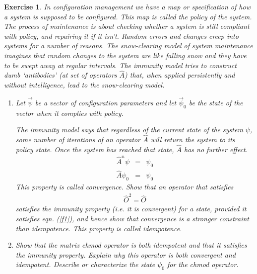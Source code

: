 \documentclass{book}
\newtheorem{exercise}{Exercise}
\def\beq{\begin{eqnarray}}
\def\eeq{\end{eqnarray}}
\begin{document}
\begin{exercise}

In configuration management we have a map or specification of how a
system is supposed to be configured. This map is called the {\em
policy} of the system. The process of maintenance is about checking
whether a system is still compliant with policy, and repairing it if
it isn't. Random errors and changes creep into systems for a number of
reasons. The {\em snow-clearing model} of system maintenance imagines
that random changes to the system are like falling snow and they have
to be swept away at regular intervals. The {\em immunity model} tries
to construct dumb `antibodies' (at set of operators $\hat A$) that,
when applied persistently and without intelligence, lead to the
snow-clearing model.
\begin{enumerate}
\item Let $\vec \psi$ be a vector of configuration parameters and let
$\vec \psi_0$ be the state of the vector when it complies with
policy.

The immunity model says that regardless of the current state of the system
$\psi$, some number of iterations of an operator $\hat A$ will return
the system to its policy state. Once the system has reached that
state, $\hat A$ has no further effect.
\beq
\hat A^n \psi &=& \psi_0\label{f1}\\
\hat A \psi_0 &=& \psi_0
\eeq
This property is called {\em convergence}.
Show that an operator that satisfies
\beq
\hat O^2 = \hat O
\eeq
satisfies the immunity property (i.e. it is convergent) for a state,
provided it satisfies eqn. (\ref{f1}),
and hence show that convergence is a stronger constraint than idempotence.
This property is called {\em idempotence}.

\item
Show that the matrix chmod operator is both idempotent and that it
satisfies the immunity property. 
Explain why this operator is both convergent and idempotent.
Describe or characterize the state
$\psi_0$ for the chmod operator.

\end{enumerate}
\end{exercise}
\begin{solution}
\end{solution}
\end{document}
